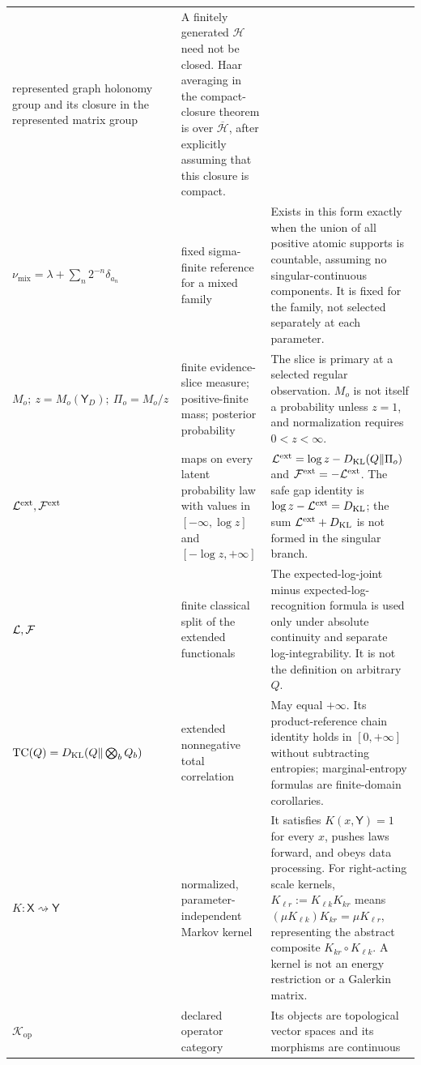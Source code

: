 \begin{longtable}{@{}>{\raggedright\arraybackslash}p{}
>{\raggedright\arraybackslash}p{}
>{\raggedright\arraybackslash}p{}@{}}
represented graph holonomy group and its closure in the represented matrix group &
A finitely generated \(\mathcal H\) need not be closed. Haar averaging in the
compact-closure theorem is over \(\overline{\mathcal H}\), after explicitly
assuming that this closure is compact. \\
\(\nu_{\mathrm{mix}}=\lambda+\sum_n2^{-n}\delta_{a_n}\) &
fixed sigma-finite reference for a mixed family &
Exists in this form exactly when the union of all positive atomic supports is
countable, assuming no singular-continuous components. It is fixed for the
family, not selected separately at each parameter. \\
\(M_o;\ z=M_o(\mathsf Y_D);\ \Pi_o=M_o/z\) &
finite evidence-slice measure; positive-finite mass; posterior probability &
The slice is primary at a selected regular observation. $M_o$ is not itself a
probability unless $z=1$, and normalization requires $0<z<\infty$. \\
\(\mathcal L^{\mathrm{ext}},\mathcal F^{\mathrm{ext}}\) &
maps on every latent probability law with values in
$[-\infty,\log z]$ and $[-\log z,+\infty]$ &
$\mathcal L^{\mathrm{ext}}=\log z-D_{\mathrm{KL}}(Q\Vert\Pi_o)$ and
$\mathcal F^{\mathrm{ext}}=-\mathcal L^{\mathrm{ext}}$. The safe gap identity is
$\log z-\mathcal L^{\mathrm{ext}}=D_{\mathrm{KL}}$; the sum
$\mathcal L^{\mathrm{ext}}+D_{\mathrm{KL}}$ is not formed in the singular branch. \\
\(\mathcal L,\mathcal F\) &
finite classical split of the extended functionals &
The expected-log-joint minus expected-log-recognition formula is used only
under absolute continuity and separate log-integrability. It is not the
definition on arbitrary $Q$. \\
\(\mathrm{TC}(Q)=D_{\mathrm{KL}}(Q\Vert\bigotimes_bQ_b)\) &
extended nonnegative total correlation &
May equal $+\infty$. Its product-reference chain identity holds in
$[0,+\infty]$ without subtracting entropies; marginal-entropy formulas are
finite-domain corollaries. \\
\(K:\mathsf X\rightsquigarrow\mathsf Y\) &
normalized, parameter-independent Markov kernel &
It satisfies \(K(x,\mathsf Y)=1\) for every \(x\), pushes laws forward, and
obeys data processing.  For right-acting scale kernels,
\(K_{\ell r}:=K_{\ell k}K_{kr}\) means
\((\mu K_{\ell k})K_{kr}=\mu K_{\ell r}\), representing the abstract
composite \(K_{kr}\circ K_{\ell k}\).  A kernel is not an energy restriction
or a Galerkin matrix. \\
\(\mathscr K_{\mathrm{op}}\) &
declared operator category &
Its objects are topological vector spaces and its morphisms are continuous

\end{longtable}
